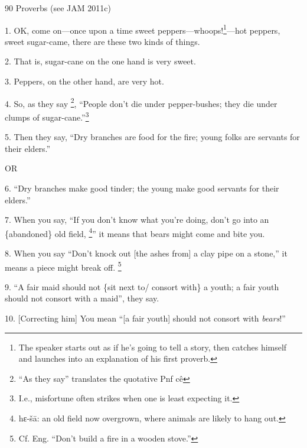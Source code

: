 
90 Proverbs (see JAM 2011c)

1. OK, come on---once upon a time sweet peppers---whoops!\footnote{The speaker starts out as if he's going to tell a story, then catches himself and launches into an explanation of his first proverb.}---hot peppers, sweet
sugar-came, there are these two kinds of things.

2. That is, sugar-cane on the one hand is very sweet.

3. Peppers, on the other hand, are very hot.

4. So, as they say \footnote{``As they say'' translates the quotative Pnf cê}, ``People don't die under pepper-bushes; they die under
clumps of sugar-cane.''\footnote{I.e., misfortune often strikes when one is least expecting it.}

5. Then they say, ``Dry branches are food for the fire; young folks are servants
for their elders.''

OR

6. ``Dry branches make good tinder; the young make good servants for their elders.''

7. When you say, ``If you don't know what you're doing, don't go into an \{abandoned\}
old field, \footnote{hɛ-šā: an old field now overgrown, where animals are likely to hang out.}'' it means that bears might come and bite you.

8. When you say ``Don't knock out [the ashes from] a clay pipe on a stone,'' it
means a piece might break off. \footnote{Cf. Eng. ``Don't build a fire in a wooden stove.''}

9. ``A fair maid should not \{sit next to/ consort with\} a youth; a fair youth
should not consort with a maid'', they say.

10. [Correcting him] You mean ``[a fair youth] should not consort with \textit{bears}!''
